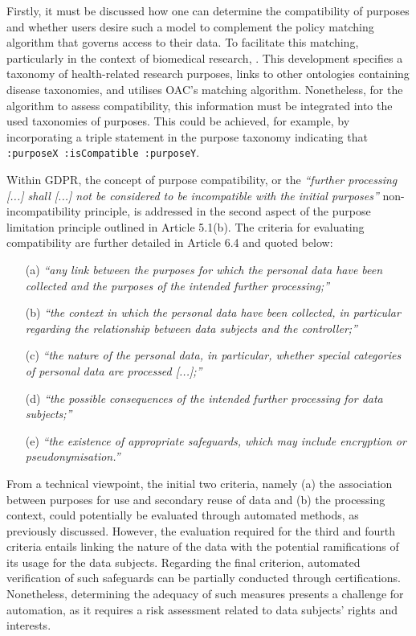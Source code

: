 Firstly, it must be discussed how one can determine the compatibility of purposes and whether users desire such a model to complement the policy matching algorithm that governs access to their data.
To facilitate this matching, particularly in the context of biomedical research, .
This development specifies a taxonomy of health-related research purposes, links to other ontologies containing disease taxonomies, and utilises OAC's matching algorithm.
Nonetheless, for the algorithm to assess compatibility, this information must be integrated into the used taxonomies of purposes.
This could be achieved, for example, by incorporating a triple statement in the purpose taxonomy indicating that \texttt{:purposeX :isCompatible :purposeY}.

Within GDPR, the concept of purpose compatibility, or the \textit{``further processing [...] shall [...] not be considered to be incompatible with the initial purposes''} non-incompatibility principle, is addressed in the second aspect of the purpose limitation principle outlined in Article 5.1(b).
The criteria for evaluating compatibility are further detailed in Article 6.4 \citeyearpar{noauthor_regulation_2016} and quoted below:

\begin{enumerate}
    \item [(a)] \textit{``any link between the purposes for which the personal data have been collected and the purposes of the intended further processing;''}
    \item [(b)] \textit{``the context in which the personal data have been collected, in particular regarding the relationship between data subjects and the controller;''}
    \item [(c)] \textit{``the nature of the personal data, in particular, whether special categories of personal data are processed [...];''}
    \item [(d)] \textit{``the possible consequences of the intended further processing for data subjects;''}
    \item [(e)] \textit{``the existence of appropriate safeguards, which may include encryption or pseudonymisation.''}
\end{enumerate}

From a technical viewpoint, the initial two criteria, namely (a) the association between purposes for use and secondary reuse of data and (b) the processing context, could potentially be evaluated through automated methods, as previously discussed.
However, the evaluation required for the third and fourth criteria entails linking the nature of the data with the potential ramifications of its usage for the data subjects.
Regarding the final criterion, automated verification of such safeguards can be partially conducted through certifications.
Nonetheless, determining the adequacy of such measures presents a challenge for automation, as it requires a risk assessment related to data subjects' rights and interests.

